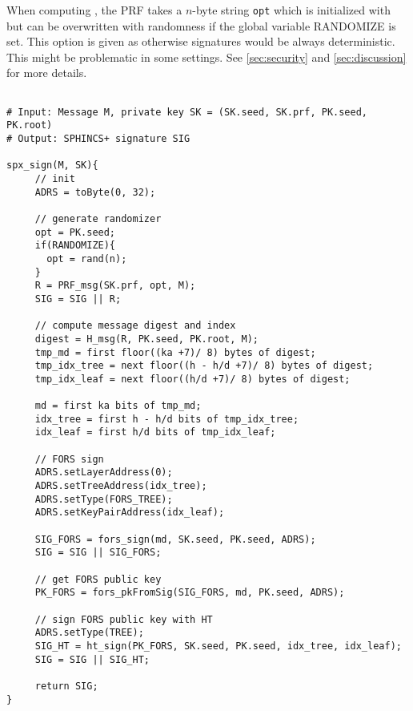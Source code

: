    When computing \Random, the PRF takes a $n$-byte string \texttt{opt}
   which is initialized with \pseed but can be overwritten with randomness
   if the global variable RANDOMIZE is set. This option is given as otherwise
   \spx signatures would be always deterministic. This might be problematic in
   some settings. See \autoref{sec:security} and \autoref{sec:discussion} for
   more details.

\begin{lstlisting}[label=alg:spx:sign, mathescape, language=pseudoc,
                   caption=\spxsign\ -- Generating a \spx signature]

# Input: Message M, private key SK = (SK.seed, SK.prf, PK.seed, PK.root)
# Output: SPHINCS+ signature SIG

spx_sign(M, SK){
     // init
     ADRS = toByte(0, 32);

     // generate randomizer
     opt = PK.seed;
     if(RANDOMIZE){
       opt = rand(n);
     }
     R = PRF_msg(SK.prf, opt, M);
     SIG = SIG || R;

     // compute message digest and index
     digest = H_msg(R, PK.seed, PK.root, M);
     tmp_md = first floor((ka +7)/ 8) bytes of digest;
     tmp_idx_tree = next floor((h - h/d +7)/ 8) bytes of digest;
     tmp_idx_leaf = next floor((h/d +7)/ 8) bytes of digest;

     md = first ka bits of tmp_md;
     idx_tree = first h - h/d bits of tmp_idx_tree;
     idx_leaf = first h/d bits of tmp_idx_leaf;

     // FORS sign
     ADRS.setLayerAddress(0);
     ADRS.setTreeAddress(idx_tree);
     ADRS.setType(FORS_TREE);
     ADRS.setKeyPairAddress(idx_leaf);

     SIG_FORS = fors_sign(md, SK.seed, PK.seed, ADRS);
     SIG = SIG || SIG_FORS;

     // get FORS public key
     PK_FORS = fors_pkFromSig(SIG_FORS, md, PK.seed, ADRS);

     // sign FORS public key with HT
     ADRS.setType(TREE);
     SIG_HT = ht_sign(PK_FORS, SK.seed, PK.seed, idx_tree, idx_leaf);
     SIG = SIG || SIG_HT;

     return SIG;
}
\end{lstlisting}

